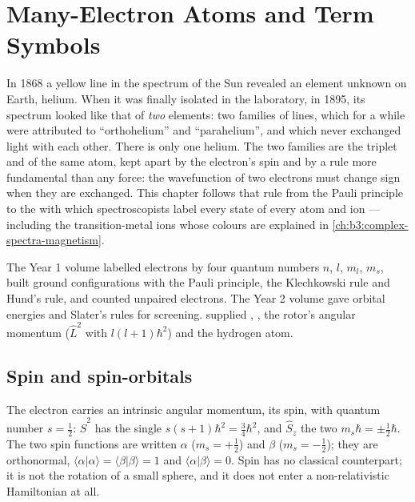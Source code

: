 \chapter{Many-Electron Atoms and Term Symbols}\label{ch:b3:many-electron-atoms}

In 1868 a yellow line in the spectrum of the Sun revealed an element
unknown on Earth, helium. When it was finally isolated in the laboratory, in
1895, its spectrum looked like that of \emph{two} elements: two families of
lines, which for a while were attributed to ``orthohelium'' and
``parahelium'', and which never exchanged light with each other. There is
only one helium. The two families are the triplet and  of the
same atom, kept apart by the electron's spin and by a rule more fundamental
than any force: the wavefunction of two electrons must change sign when they
are exchanged. This chapter follows that rule from the Pauli principle to
the  with which spectroscopists label every state of every atom
and ion --- including the transition-metal ions whose colours are explained
in \cref{ch:b3:complex-spectra-magnetism}.

\begin{recall}
The Year 1 volume labelled electrons by four quantum numbers $n$, $l$,
$m_l$, $m_s$, built ground configurations with the Pauli principle, the
Klechkowski rule and Hund's rule, and counted unpaired electrons. The Year 2
volume gave orbital energies and Slater's rules for screening.
 supplied , , the
rotor's angular momentum ($\hat L^2$ with  $l(l+1)\hbar^2$) and the
hydrogen atom.
\end{recall}

\section{Spin and spin-orbitals}

The electron carries an intrinsic angular momentum, its spin, with quantum
number $s = \frac12$: $\hat S^2$ has the single  $s(s+1)\hbar^2 =
\frac34\hbar^2$, and $\hat S_z$ the two  $m_s\hbar = \pm\frac12\hbar$.
The two spin functions are written $\alpha$ ($m_s = +\frac12$) and $\beta$
($m_s = -\frac12$); they are orthonormal, $\langle\alpha|\alpha\rangle =
\langle\beta|\beta\rangle = 1$ and $\langle\alpha|\beta\rangle = 0$. Spin has no
classical counterpart; it is not the rotation of a small sphere, and it
does not enter a non-relativistic Hamiltonian at all.

